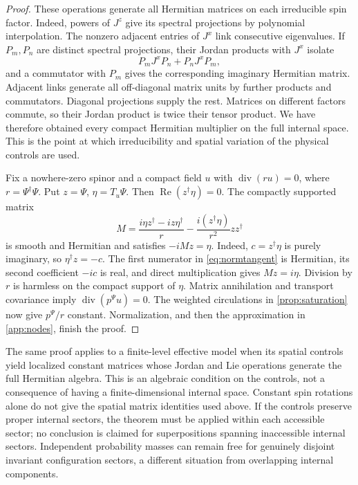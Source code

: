 \documentclass[11pt]{article}
\numberwithin{equation}{section}
\theoremstyle{definition}
\newcommand{\diver}{\operatorname{div}}
\begin{document}
\begin{proof}
These operations generate all Hermitian matrices on each irreducible spin factor. Indeed, powers of \(J^z\) give its spectral projections by polynomial interpolation. The nonzero adjacent entries of \(J^x\) link consecutive eigenvalues. If \(P_m,P_n\) are distinct spectral projections, their Jordan products with \(J^x\) isolate
\[
 P_mJ^xP_n+P_nJ^xP_m,
\]
and a commutator with \(P_m\) gives the corresponding imaginary Hermitian matrix. Adjacent links generate all off-diagonal matrix units by further products and commutators. Diagonal projections supply the rest. Matrices on different factors commute, so their Jordan product is twice their tensor product. We have therefore obtained every compact Hermitian multiplier on the full internal space. This is the point at which irreducibility and spatial variation of the physical controls are used.

Fix a nowhere-zero spinor and a compact field \(u\) with \(\diver(ru)=0\), where \(r=\Psi^\dagger\Psi\). Put \(z=\Psi\), \(\eta=T_u\Psi\). Then \(\operatorname{Re}(z^\dagger\eta)=0\). The compactly supported matrix
\begin{equation}\label{eq:normtangent}
 M=\frac{i\eta z^\dagger-iz\eta^\dagger}{r}
       -\frac{i(z^\dagger\eta)}{r^2}zz^\dagger
\end{equation}
is smooth and Hermitian and satisfies \(-iMz=\eta\). Indeed, \(c=z^\dagger\eta\) is purely imaginary, so \(\eta^\dagger z=-c\). The first numerator in \eqref{eq:normtangent} is Hermitian, its second coefficient \(-ic\) is real, and direct multiplication gives \(Mz=i\eta\). Division by \(r\) is harmless on the compact support of \(\eta\). Matrix annihilation and transport covariance imply \(\diver(p^\Psi u)=0\). The weighted circulations in \cref{prop:saturation} now give \(p^\Psi/r\) constant. Normalization, and then the approximation in \cref{app:nodes}, finish the proof.
\end{proof}

The same proof applies to a finite-level effective model when its spatial controls yield localized constant matrices whose Jordan and Lie operations generate the full Hermitian algebra. This is an algebraic condition on the controls, not a consequence of having a finite-dimensional internal space. Constant spin rotations alone do not give the spatial matrix identities used above. If the controls preserve proper internal sectors, the theorem must be applied within each accessible sector; no conclusion is claimed for superpositions spanning inaccessible internal sectors. Independent probability masses can remain free for genuinely disjoint invariant configuration sectors, a different situation from overlapping internal components.
\end{document}
